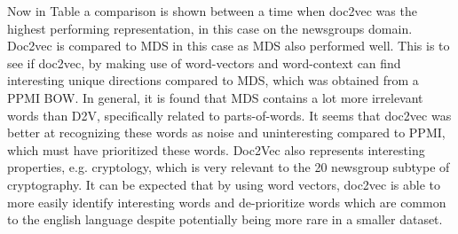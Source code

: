 Now in Table \label{ch3:compared2vmds} a comparison is shown between a time when doc2vec was the highest performing representation, in this case on the newsgroups domain. Doc2vec is compared to MDS in this case as MDS also performed well. This is to see if doc2vec, by making use of word-vectors and word-context can find interesting unique directions compared to MDS, which was obtained from a PPMI BOW. In general, it is found that MDS contains a lot more irrelevant words than D2V, specifically related to parts-of-words. It seems that doc2vec was better at recognizing these words as noise and uninteresting compared to PPMI, which must have prioritized these words. Doc2Vec also represents interesting properties, e.g. cryptology, which is very relevant to the 20 newsgroup subtype of cryptography. It can be expected that by using word vectors, doc2vec is able to more easily identify interesting words and de-prioritize words which are common to the english language despite potentially being more rare in a smaller dataset.

